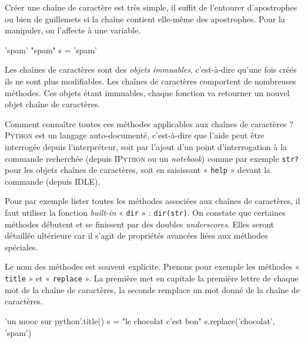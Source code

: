 Créer une chaîne de caractère est très simple, il suffit de l'entourer d'apostrophes ou bien de guillemets si la chaîne contient elle-même des apostrophes. Pour la manipuler, on l'affecte à une variable.

\begin{idleconsole}
	\begin{pyconsole}
		'spam'
		"spam"
		s = 'spam'
	\end{pyconsole}
\end{idleconsole}

Les chaînes de caractères sont des \emph{objets immuables}, c'est-à-dire qu'une fois créés ils ne sont plus modifiables. Les chaînes de caractères comportent de nombreuses méthodes. Ces objets étant immuables, chaque fonction va retourner un nouvel objet chaîne de caractères. 

Comment connaître toutes ces méthodes applicables aux chaînes de caractères ? \textsc{Python} est un langage auto-documenté, c'est-à-dire que l'aide peut être interrogée depuis l'interpréteur, soit par l'ajout d'un point d'interrogation à la commande recherchée (depuis \textsc{IPython} ou un \textit{notebook}) comme par exemple \texttt{str?} pour les objets chaînes de caractères, soit en saisissant « \texttt{help} » devant la commande (depuis IDLE).

Pour par exemple lister toutes les méthodes associées aux chaînes de caractères, il faut utiliser la fonction \textit{built-in} « \texttt{dir} » : \texttt{dir(str)}.
On constate que certaines méthodes débutent et se finissent par des doubles \textit{underscores}. Elles seront détaillée ultérieure car il s'agit de propriétés avancées liées aux méthodes spéciales.

Le nom des méthodes est souvent explicite. Prenons pour exemple les méthodes « \texttt{title} » et « \texttt{replace} ». La première met en capitale la première lettre de chaque mot de la chaîne de caractères, la seconde remplace un mot donné de la chaîne de caractères.

\begin{idleconsole}
	\begin{pyconsole}
		'un mooc sur python'.title()
		s = "le chocolat c'est bon"
		s.replace('chocolat', 'spam')
	\end{pyconsole}
\end{idleconsole}

